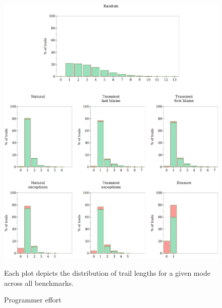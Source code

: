 \begin{figure} \footnotesize \centering
  \includegraphics[width=\textwidth]{./plots/bt-lengths-table}

  \vspace{1em}
  \begin{minipage}{0.95\textwidth}
    Each plot depicts the distribution of trail lengths for a given mode across all benchmarks.
  \end{minipage}

  \caption{Programmer effort} \label{fig:effort-table}
\end{figure}

